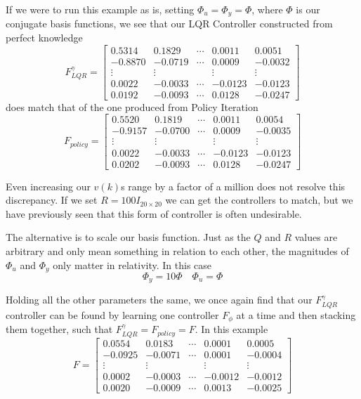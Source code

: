 If we were to run this example as is, setting $\Phi_u = \Phi_y = \Phi$, where $\Phi$ is our conjugate basis functions, we see that our LQR Controller constructed from perfect knowledge
\begin{equation}
    F_{LQR}^\gamma = 
    \begin{bmatrix}
        0.5314  &  0.1829 & \cdots & 0.0011 &   0.0051\\
        -0.8870 &  -0.0719  & \cdots &  0.0009 &  -0.0032\\
        \vdots & \vdots & & \vdots & \vdots \\
        0.0022 &  -0.0033 & \cdots &  -0.0123 &  -0.0123\\
        0.0192 &  -0.0093  & \cdots &  0.0128 &  -0.0247
    \end{bmatrix}
\end{equation}
does match that of the one produced from Policy Iteration
\begin{equation}
    F_{policy} = 
    \begin{bmatrix}
        0.5520  &  0.1819 & \cdots &   0.0011 &   0.0054\\
        -0.9157 &  -0.0700 & \cdots &   0.0009 &  -0.0035\\
        \vdots & \vdots & & \vdots & \vdots \\
         0.0022 &  -0.0033 & \cdots &  -0.0123 &  -0.0123\\
         0.0202 &  -0.0093  & \cdots &  0.0128 &  -0.0247
    \end{bmatrix}
\end{equation}

Even increasing our $v(k)$s range by a factor of a million does not resolve this discrepancy. If we set $R = 100I_{20 \times 20}$ we can get the controllers to match, but we have previously seen that this form of controller is often undesirable.

The alternative is to scale our basis function. Just as the $Q$ and $R$ values are arbitrary and only mean something in relation to each other, the magnitudes of $\Phi_u$ and $\Phi_y$ only matter in relativity. In this case
\begin{equation}
    \Phi_y = 10\Phi
    \quad
    \Phi_u = \Phi
\end{equation}

Holding all the other parameters the same, we once again find that our $F_{LQR}^\gamma$ controller can be found by learning one controller $F_\phi$ at a time and then stacking them together, such that $F_{LQR}^\gamma = F_{policy} = F$.  In this example
\begin{equation}
    F
    = 
    \begin{bmatrix}
        0.0554  &  0.0183 & \cdots &   0.0001 &   0.0005\\
        -0.0925 &  -0.0071 & \cdots &   0.0001 &  -0.0004\\
        \vdots & \vdots & & \vdots & \vdots \\
        0.0002 &  -0.0003 & \cdots &  -0.0012 &  -0.0012\\
        0.0020 &  -0.0009  & \cdots &  0.0013 &  -0.0025
    \end{bmatrix}
\end{equation}

